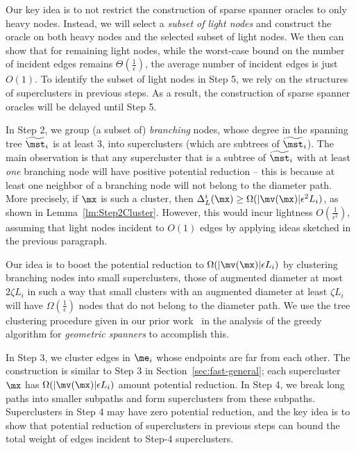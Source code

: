Our key idea is to not restrict the construction of sparse spanner oracles to only heavy nodes. Instead,  we will select a \emph{subset of light nodes} and construct the oracle on both heavy nodes and the selected subset of light nodes. We then can show that for remaining light nodes, while the worst-case bound on the number of incident edges remains $\Theta(\frac{1}{\epsilon})$, the average number of incident edges is just $O(1)$. To identify the subset of light nodes in Step 5, we rely on the structures of superclusters  in previous steps. As a result, the construction of sparse spanner oracles will be delayed until Step 5. 

In Step 2, we group (a subset of) \emph{branching} nodes, whose degree in the spanning tree $\widetilde{\mst}_i$ is at least $3$, into superclusters (which are subtrees of $\widetilde{\mst}_i$).  The main observation is that any supercluster that is a subtree of $\widetilde{\mst}_i$ with at least \emph{one} branching node will have positive potential reduction --  this is because at least one neighbor of a branching node will not belong to the diameter path. More precisely, if $\mx$ is such a cluster, then $\Delta^i_{L}(\mx) \geq \Omega(|\mv(\mx)|\epsilon^2 L_i )$, as shown in Lemma~\ref{lm:Step2Cluster}. However, this would incur lightness $O(\frac{1}{\epsilon^2})$, assuming that light nodes incident to $O(1)$ edges by applying ideas sketched in the previous paragraph. 

Our idea is to boost the potential reduction to $\Omega(|\mv(\mx)|\epsilon L_i )$ by clustering branching nodes into small superclusters, those of augmented diameter at most $2\zeta L_i$ in such a way that small clusters with an augmented diameter at least $\zeta L_i$ will have $\Omega(\frac{1}{\epsilon})$ nodes that do not belong to the diameter path. We use the tree clustering procedure given in our prior work~\cite{LS19} in the analysis of the greedy algorithm for \emph{geometric spanners} to accomplish this.

In Step 3, we cluster edges in $\me_i$ whose endpoints are far from each other. The construction is similar to Step 3 in Section~\ref{sec:fast-general}; each supercluster $\mx$ has $\Omega(|\mv(\mx)|\epsilon L_i)$  amount  potential reduction.   In Step 4, we break long paths into smaller subpaths and form superclusters from these subpaths. Superclusters in Step 4 may have zero potential reduction, and the key idea is to show that potential reduction of superclusters in previous steps can bound the total weight of edges incident to Step-4 superclusters. 

